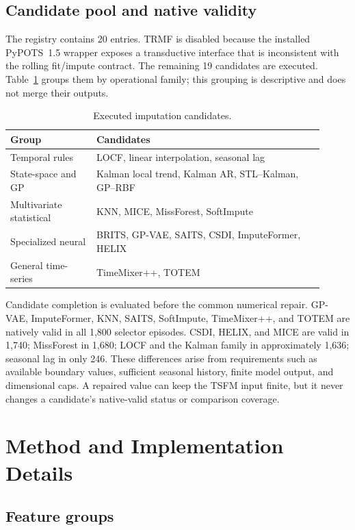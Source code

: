\subsection{Candidate pool and native validity}
\label{app:candidates}

The registry contains 20 entries. TRMF is disabled because the installed PyPOTS~1.5 wrapper exposes a transductive interface that is inconsistent with the rolling fit/impute contract. The remaining 19 candidates are executed. Table~\ref{tab:candidates} groups them by operational family; this grouping is descriptive and does not merge their outputs.

\begin{table}[h]
\centering
\small
\caption{Executed imputation candidates.}
\label{tab:candidates}
\begin{tabular}{p{0.25\linewidth}p{0.66\linewidth}}
\toprule
Group & Candidates \\
\midrule
Temporal rules & LOCF, linear interpolation, seasonal lag \\
State-space and GP & Kalman local trend, Kalman AR, STL--Kalman, GP--RBF \\
Multivariate statistical & KNN, MICE, MissForest, SoftImpute \\
Specialized neural & BRITS, GP-VAE, SAITS, CSDI, ImputeFormer, HELIX \\
General time-series & TimeMixer++, TOTEM \\
\bottomrule
\end{tabular}
\end{table}

Candidate completion is evaluated before the common numerical repair. GP-VAE, ImputeFormer, KNN, SAITS, SoftImpute, TimeMixer++, and TOTEM are natively valid in all 1,800 selector episodes. CSDI, HELIX, and MICE are valid in 1,740; MissForest in 1,680; LOCF and the Kalman family in approximately 1,636; seasonal lag in only 246. These differences arise from requirements such as available boundary values, sufficient seasonal history, finite model output, and dimensional caps. A repaired value can keep the TSFM input finite, but it never changes a candidate's native-valid status or comparison coverage.

\section{Method and Implementation Details}
\label{app:method-details}

\subsection{Feature groups}

